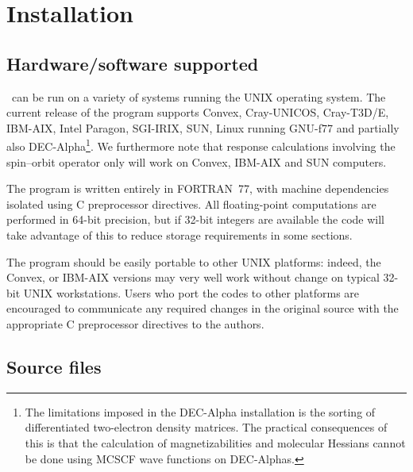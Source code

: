 \chapter{Installation}\label{ch:install}

\section{Hardware/software
supported}\label{sec:hardsoft}

          \siraba\ can be run on a variety of systems running the UNIX
operating system.  The current
release of the program supports 
Convex, Cray-UNICOS,
Cray-T3D/E, 
IBM-AIX, Intel Paragon,
SGI-IRIX, SUN,
Linux running GNU-f77 and partially also
DEC-Alpha\footnote{The limitations imposed in the
DEC-Alpha installation is the sorting of differentiated two-electron
density matrices. The practical consequences of this is that the
calculation of magnetizabilities and molecular
Hessians cannot be done 
using MCSCF wave functions on DEC-Alphas.}. We
furthermore note that 
response calculations involving the spin--orbit
operator only will  work on Convex, IBM-AIX and SUN computers.

          The program is written entirely in
FORTRAN~77, with 
machine dependencies isolated using C preprocessor directives.  All floating-point computations are
performed in 64-bit precision, but if 32-bit integers are
available the code will take advantage of this to reduce storage
requirements in some sections.

          The program should be easily portable to other UNIX
platforms: indeed, the Convex, or
IBM-AIX versions  
may very well work without change on typical 32-bit UNIX workstations.
Users who port the codes to other platforms are encouraged to
communicate any required changes in the original source with the
appropriate C preprocessor directives to the authors.

\section{Source files}\label{sec:source}

